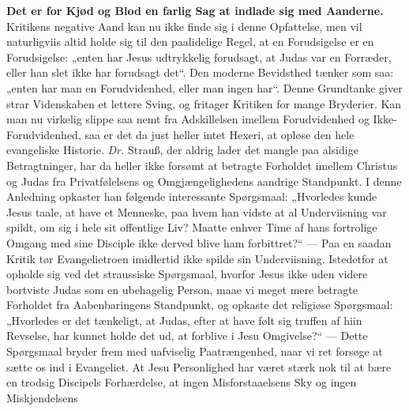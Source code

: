 \documentclass[12pt,a4paper]{book}
\begin{document}
\textbf{Det er for Kjød og Blod en farlig Sag at indlade sig med Aanderne.}
Kritikens negative Aand kan nu ikke finde sig i denne Opfattelse, men vil naturligviis altid
holde sig til den paalidelige Regel, at en Forudsigelse er en Forudsigelse: „enten har Jesus
udtrykkelig forudsagt, at Judas var en Forræder, eller han slet ikke har forudsagt det“. Den
moderne Bevidsthed tænker som saa: „enten har man en Forudvidenhed, eller man ingen har“.
Denne Grundtanke giver strar Videnskaben et lettere Sving, og fritager Kritiken for mange
Bryderier. Kan man nu virkelig slippe saa nemt fra Adskillelsen imellem Forudvidenhed og
Ikke-Forudvidenhed, saa er det da just heller intet Hexeri, at opløse den hele evangeliske
Historie. \textit{Dr.} Strauß, der aldrig lader det mangle paa alsidige Betragtninger, har
da heller ikke forsømt at betragte Forholdet imellem Christus og Judas fra Privatfølelsens
og Omgjængelighedens aandrige Standpunkt. I denne Anledning opkaster han følgende
interessante Spørgsmaal: „Hvorledes kunde Jesus taale, at have et Menneske, paa hvem han
vidste at al Underviisning var spildt, om sig i hele sit offentlige Liv? Maatte enhver Time
af hans fortrolige Omgang med sine Disciple ikke derved blive ham forbittret?“ --- Paa en
saadan Kritik tør Evangelietroen imidlertid ikke spilde sin Underviisning. Istedetfor at
opholde sig ved det straussiske Spørgsmaal, hvorfor Jesus ikke uden videre bortviste Judas
som en ubehagelig Person, maae vi meget mere betragte Forholdet fra Aabenbaringens
Standpunkt, og opkaste det religiøse Spørgsmaal: „Hvorledes er det tænkeligt, at Judas,
efter at have følt sig truffen af hiin Revselse, har kunnet holde det ud, at forblive i Jesu
Omgivelse?“ --- Dette Spørgsmaal bryder frem med uafviselig Paatrængenhed, naar vi ret
forsøge at sætte os ind i Evangeliet. At Jesu Personlighed har været stærk nok til at bære
en trodsig Discipels Forhærdelse, at ingen Misforstaaelsens Sky og ingen Miskjendelsens
\end{document}
